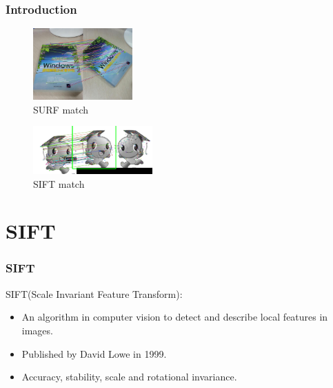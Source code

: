 \documentclass[notheorems, serif, table, compress]{beamer}  %
\begin{document}
\begin{frame}[fragile]
\frametitle{Introduction}

\begin{figure}[!ht]
  \centering\includegraphics[width=1.5in]{surfmatch.png}
  \caption{SURF match}
 \label{surfmatch}
  \end{figure}


\begin{figure}[!ht]
  \centering\includegraphics[width=1.8in]{siftmatch.png}
  \caption{SIFT match}
 \label{siftmatch}
  \end{figure}
\end{frame}


\section{SIFT}

\begin{frame}[fragile]
\frametitle{SIFT}

SIFT(Scale Invariant Feature Transform):

\begin{itemize}
\item An algorithm in computer vision to detect and describe local features in images. %

\item Published by David Lowe in 1999.%

\item Accuracy, stability, scale and rotational invariance. 

\end{itemize}
\end{frame}
\end{document}
